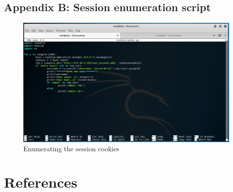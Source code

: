 \documentclass{report}
\begin{document}
\section{Appendix B: Session enumeration script}
\begin{figure}[!htb]
	\centering
	\includegraphics[scale=0.4]{img/cookiescript.png}
	\caption{Enumerating the session cookies}
\end{figure}

\chapter{References}
\end{document}
